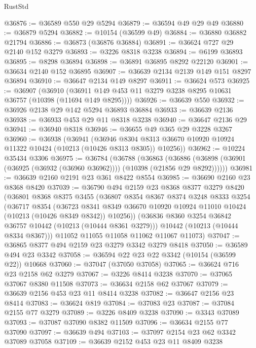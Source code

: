 \begin{lexlean}{RustStd}
\begin{coremodule}
@36876 := @36589 @550 @29 @5294
@36879 := @36594 @49 @29 @49
@36880 := @36879 @5294
@36882 := @10154 (@36599 @49)
@36884 := @36880 @36882 @21794
@36886 := @36873 (@36876 @36884)
@36891 := @36624 @727 @29 @2140 @152 @3279
@36893 := @3226 @8318 @3238
@36894 := @6199 @36893
@36895 := @8298 @36894
@36898 := @36891 @36895 @8292 @22120
@36901 := @36634 @2140 @152 @36895
@36907 := @36639 @2134 @2139 @149 @151 @8297 @36894
@36910 := @36647 @2134 @149 @8297
@36911 := @36624 @573
@36925 := @36907
    (@36910 (@36911 @149 @453 @11 @3279 @3238 @8295 @10631 @36757 (@10398 (@11694 @149 @8295))))
@36926 := @36639 @550
@36932 := @36926 @2138 @29 @142 @5294 @36893 @36884
@36933 := @36639 @2136
@36938 := @36933 @453 @29 @11 @8318 @3238
@36940 := @36647 @2136 @29
@36941 := @36940 @8318
@36946 := @36655 @49 @365 @29 @3228 @3267
@36960 := @36938
    (@36941
      (@36946 @8304 @8313 @36670 @10920 @10924 @11322 @10424 (@10213 (@10426 @8313 @8305)) @10256))
@36962 := @10224 @35434 @3306
@36975 := @36784
    (@36788
      (@36863
        (@36886 (@36898 (@36901 (@36925 (@36932 (@36960 @36962)))) (@10398 (@21856 @29 @8292))))))
@36981 := @36639 @2160 @2191 @23 @361 @8422 @8554
@36985 := @36690 @2160 @23 @8368 @8420
@37039 := @36790
    @494
    @2159
    @23
    @8368
    @8377
    @3279
    @8420
    (@36801
      @8368
      @8375
      @3455
      (@36807
        @8354
        @8367
        @8374
        @3248
        @8333
        @3254
        (@36717
          @8354
          (@36723
            @8341
            @8349
            @36670
            @10920
            @10924
            @11010
            @10424
            (@10213 (@10426 @8349 @8342))
            @10256))
        (@36836 @8360 @3254 @36842 @36757 @10442 (@10213 (@10444 @8361 @3279)))
        @10442
        (@10213 (@10444 @8334 @8367)))
      @11052
      @11055
      @11058
      @11062
      @11067
      @11073)
@37047 := @36865 @8377 @494 @2159 @23 @3279 @3342 @3279 @8418
@37050 := @36589 @494 @23 @3342
@37058 := @36594 @22 @23 @22 @3342 (@10154 (@36599 @22)) @10668
@37060 := @37047 (@37050 @37058)
@37065 := @36624 @716 @23 @2158 @62 @3279
@37067 := @3226 @8414 @3238
@37070 := @37065 @37067 @8380 @11508
@37073 := @36634 @2158 @62 @37067
@37079 := @36639 @2156 @453 @23 @11 @8414 @3238
@37082 := @36647 @2156 @23 @8414
@37083 := @36624 @819
@37084 := @37083 @23
@37087 := @37084 @2155 @77 @3279
@37089 := @3226 @8409 @3238
@37090 := @3343 @37089
@37093 := @37087 @37090 @8382 @11509
@37096 := @36634 @2155 @77 @37090
@37097 := @36639 @494
@37103 := @37097 @2154 @23 @62 @3342 @37089 @37058
@37109 := @36639 @2152 @453 @23 @11 @8409 @3238

\end{coremodule}
\end{lexlean}

